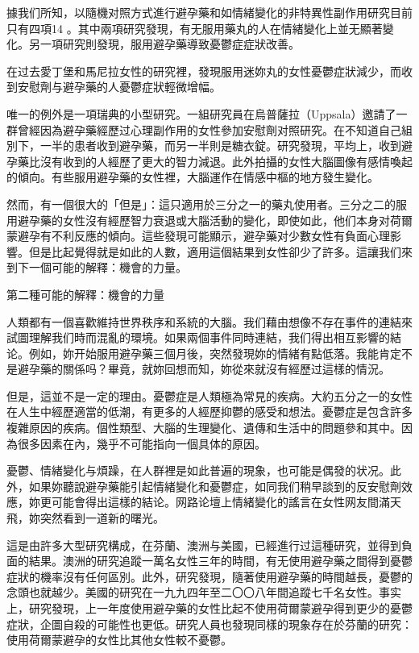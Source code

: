 \documentclass[12pt,UTF8]{ctexbook}
\begin{document}
據我们所知，以隨機对照方式進行避孕藥和如情緒變化的非特異性副作用研究目前只有四項14 。其中兩項研究發現，有无服用藥丸的人在情緒變化上並无顯著變化。另一項研究則發現，服用避孕藥導致憂鬱症症狀改善。

在过去愛丁堡和馬尼拉女性的研究裡，發現服用迷妳丸的女性憂鬱症狀減少，而收到安慰劑与避孕藥的人憂鬱症狀輕微增幅。

唯一的例外是一項瑞典的小型研究。一組研究員在烏普薩拉（Uppsala）邀請了一群曾經因為避孕藥經歷过心理副作用的女性參加安慰劑对照研究。在不知道自己組別下，一半的患者收到避孕藥，而另一半則是糖衣錠。研究發現，平均上，收到避孕藥比沒有收到的人經歷了更大的智力減退。此外拍攝的女性大腦圖像有感情喚起的傾向。有些服用避孕藥的女性裡，大腦運作在情感中樞的地方發生變化。

然而，有一個很大的「但是」：這只適用於三分之一的藥丸使用者。三分之二的服用避孕藥的女性沒有經歷智力衰退或大腦活動的變化，即使如此，他们本身对荷爾蒙避孕有不利反應的傾向。這些發現可能顯示，避孕藥对少數女性有負面心理影響。但是比起覺得就是如此的人數，適用這個結果到女性卻少了許多。這讓我们來到下一個可能的解釋：機會的力量。





第二種可能的解釋：機會的力量

人類都有一個喜歡維持世界秩序和系統的大腦。我们藉由想像不存在事件的連結來試圖理解我们時而混亂的環境。如果兩個事件同時連結，我们得出相互影響的結论。例如，妳开始服用避孕藥三個月後，突然發現妳的情緒有點低落。我能肯定不是避孕藥的關係吗？畢竟，就妳回想而知，妳從來就沒有經歷过這樣的情況。

但是，這並不是一定的理由。憂鬱症是人類極為常見的疾病。大約五分之一的女性在人生中經歷適當的低潮，有更多的人經歷抑鬱的感受和想法。憂鬱症是包含許多複雜原因的疾病。個性類型、大腦的生理變化、遺傳和生活中的問題參和其中。因為很多因素在內，幾乎不可能指向一個具体的原因。

憂鬱、情緒變化与煩躁，在人群裡是如此普遍的現象，也可能是偶發的状况。此外，如果妳聽說避孕藥能引起情緒變化和憂鬱症，如同我们稍早談到的反安慰劑效應，妳更可能會得出這樣的結论。网路论壇上情緒變化的謠言在女性网友間滿天飛，妳突然看到一道新的曙光。

這是由許多大型研究構成，在芬蘭、澳洲与美國，已經進行过這種研究，並得到負面的結果。澳洲的研究追蹤一萬名女性三年的時間，有无使用避孕藥之間得到憂鬱症狀的機率沒有任何區別。此外，研究發現，隨著使用避孕藥的時間越長，憂鬱的念頭也就越少。美國的研究在一九九四年至二〇〇八年間追蹤七千名女性。事实上，研究發現，上一年度使用避孕藥的女性比起不使用荷爾蒙避孕得到更少的憂鬱症狀，企圖自殺的可能性也更低。研究人員也發現同樣的現象存在於芬蘭的研究：使用荷爾蒙避孕的女性比其他女性較不憂鬱。
\end{document}
